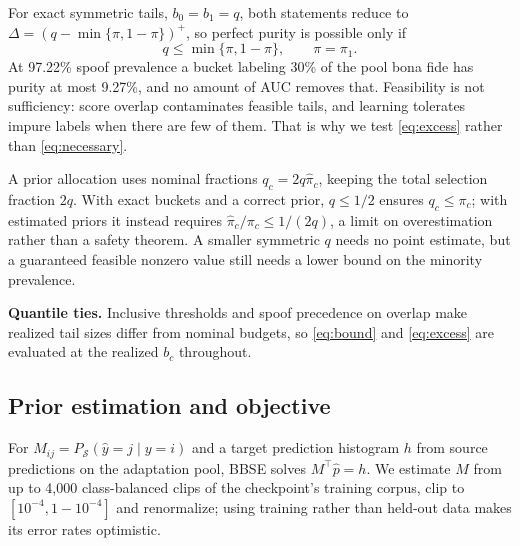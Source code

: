 \documentclass[10pt,letterpaper]{article}
\begin{document}
For exact symmetric tails, $b_0=b_1=q$, both statements reduce to
$\Delta=(q-\min\{\pi,1-\pi\})^{+}$, so perfect purity is possible only if
\begin{equation}
 q\leq\min\{\pi,1-\pi\},\qquad \pi=\pi_1.
 \label{eq:necessary}
\end{equation}
At 97.22\% spoof prevalence a bucket labeling 30\% of the pool bona fide has
purity at most 9.27\%, and no amount of AUC removes that. Feasibility is not
sufficiency: score overlap contaminates feasible tails, and learning tolerates
impure labels when there are few of them. That is why we test
\eqref{eq:excess} rather than \eqref{eq:necessary}.

A prior allocation uses nominal fractions $q_c=2q\hat\pi_c$, keeping the total
selection fraction $2q$. With exact buckets and a correct prior, $q\leq1/2$
ensures $q_c\leq\pi_c$; with estimated priors it instead requires
$\hat\pi_c/\pi_c\leq1/(2q)$, a limit on overestimation rather than a safety
theorem. A smaller symmetric $q$ needs no point estimate, but a guaranteed
feasible nonzero value still needs a lower bound on the minority prevalence.

\textbf{Quantile ties.} Inclusive thresholds and spoof precedence on overlap
make realized tail sizes differ from nominal budgets, so \eqref{eq:bound} and
\eqref{eq:excess} are evaluated at the realized $b_c$ throughout.

\subsection{Prior estimation and objective}
For $M_{ij}=P_{\mathcal S}(\hat y=j\mid y=i)$ and a target prediction histogram
$h$ from source predictions on the adaptation pool, BBSE solves
$M^\top\hat p=h$. We estimate $M$ from up to 4,000 class-balanced clips of the
checkpoint's training corpus, clip to $[10^{-4},1-10^{-4}]$ and renormalize;
using training rather than held-out data makes its error rates optimistic.
\end{document}
